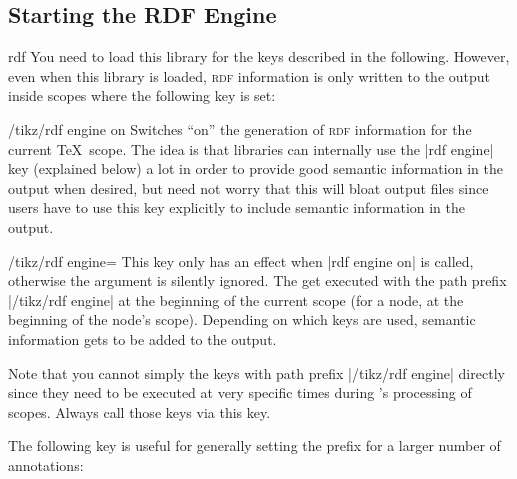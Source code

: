 \subsection{Starting the RDF Engine}

\begin{tikzlibrary}{rdf}
    You need to load this library for the keys described in the following.
    However, even when this library is loaded, \textsc{rdf} information is only
    written to the output inside scopes where the following key is set:
    \begin{key}{/tikz/rdf engine on}
        Switches ``on'' the generation of \textsc{rdf} information for the
        current \TeX\ scope. The idea is that libraries can internally use the
        |rdf engine| key (explained below) a lot in order to provide good
        semantic information in the output when desired, but need not worry
        that this will bloat output files since users have to use this key
        explicitly to include semantic information in the output.
    \end{key}
\end{tikzlibrary}

\begin{key}{/tikz/rdf engine=}
    This key only has an effect when |rdf engine on| is called, otherwise the
    argument is silently ignored. The  get executed with the
    path prefix |/tikz/rdf engine| at the beginning of the current scope (for a
    node, at the beginning of the node's scope). Depending on which keys are
    used, semantic information gets to be added to the output.

    Note that you cannot simply the keys with path prefix |/tikz/rdf engine|
    directly since they need to be executed at very specific times during
    \tikzname's processing of scopes. Always call those keys via this key.
\end{key}

The following key is useful for generally setting the prefix for a larger
number of annotations:

